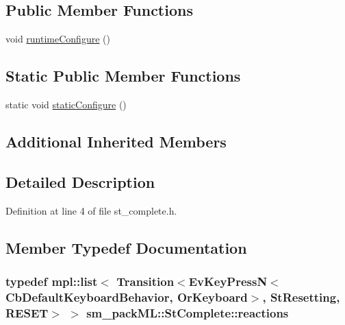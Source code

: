 \subsection*{Public Member Functions}
\begin{DoxyCompactItemize}
\item 
void \hyperlink{structsm__packML_1_1StComplete_aa499430406fce4eac712ca5a47f28027}{runtime\+Configure} ()
\end{DoxyCompactItemize}
\subsection*{Static Public Member Functions}
\begin{DoxyCompactItemize}
\item 
static void \hyperlink{structsm__packML_1_1StComplete_a800b03ade903de294f66fc2874bba57b}{static\+Configure} ()
\end{DoxyCompactItemize}
\subsection*{Additional Inherited Members}


\subsection{Detailed Description}


Definition at line 4 of file st\+\_\+complete.\+h.



\subsection{Member Typedef Documentation}
\subsubsection[{\texorpdfstring{reactions}{reactions}}]{\setlength{\rightskip}{0pt plus 5cm}typedef mpl\+::list$<$ Transition$<$Ev\+Key\+PressN$<$Cb\+Default\+Keyboard\+Behavior, {\bf Or\+Keyboard}$>$, {\bf St\+Resetting}, {\bf R\+E\+S\+ET}$>$ $>$ {\bf sm\+\_\+pack\+M\+L\+::\+St\+Complete\+::reactions}}\hypertarget{structsm__packML_1_1StComplete_a37887e4ae44b8c4c4d6081fe95b52bdc}{}\label{structsm__packML_1_1StComplete_a37887e4ae44b8c4c4d6081fe95b52bdc}


